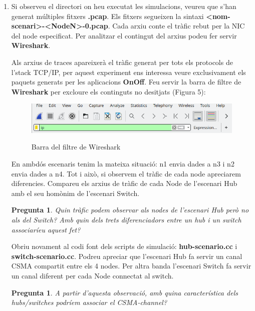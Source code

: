 \documentclass[12pt,a4paper]{article}
\newcounter{exercises}
\newtheorem{exer}[exercises]{Pregunta}
\begin{document}
\begin{enumerate}
\item Si observeu el directori on heu executat les simulacions, veureu que s'han generat múltiples fitxers \textbf{.pcap}. Els fitxers segueixen la sintaxi \textbf{<nom-scenari>-<NodeN>-0.pcap}. Cada arxiu conte el tràfic rebut per la NIC del node especificat. Per analitzar el contingut del arxius podeu fer servir \textbf{Wireshark}. 

Als arxius de traces apareixerà el tràfic generat per tots els protocols de l'stack TCP/IP, per aquest experiment ens interessa veure exclusivament els paquets generats per les aplicacions \textbf{OnOff}. Feu servir la barra de filtre de \textbf{Wireshark} per excloure els continguts no desitjats (Figura 5):

\begin{figure}[!ht]
  \begin{center}
    \includegraphics[width=1\textwidth]{wireshark-filter}    
    \label{wireshark-filter}
    \caption{Barra del filtre de Wireshark}
  \end{center}
\end{figure}

En ambdós escenaris tenim la mateixa situació: n1 envia dades a n3 i n2 envia dades a n4. Tot i això, si observem el tràfic de cada node apreciarem diferencies. Compareu els arxius de tràfic de cada Node de l'escenari Hub amb el seu homònim de l'escenari Switch.

\begin{exer} Quin tràfic podem observar als nodes de l'escenari Hub però no als del Switch? Amb quin dels trets diferenciadors entre un hub i un switch associaríeu aquest fet?\end{exer}

Obriu novament al codi font dels scripts de simulació: \textbf{hub-scenario.cc} i \textbf{switch-scenario.cc}. Podreu apreciar que l'escenari Hub fa servir un canal CSMA compartit entre els 4 nodes. Per altra banda l'escenari Switch fa servir un canal diferent per cada Node connectat al switch.

\begin{exer} A partir d'aquesta observació, amb quina característica dels hubs/switches podríem associar el CSMA-channel? \end{exer}


\end{enumerate}
\end{document}
